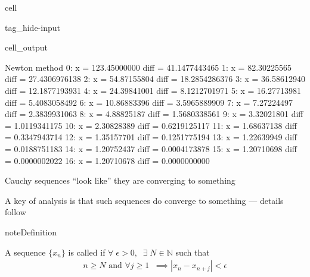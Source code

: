 \documentclass[letterpaper,10pt,english]{jupyterBook}
\begin{document}
\begin{sphinxuseclass}{cell}
\begin{sphinxuseclass}{tag_hide-input}\begin{sphinxVerbatimOutput}

\begin{sphinxuseclass}{cell_output}
\begin{sphinxVerbatim}[commandchars=\\\{\}]
Newton method
   0:  x =   123.45000000    diff =  41.1477443465
   1:  x =    82.30225565    diff =  27.4306976138
   2:  x =    54.87155804    diff =  18.2854286376
   3:  x =    36.58612940    diff =  12.1877193931
   4:  x =    24.39841001    diff =   8.1212701971
   5:  x =    16.27713981    diff =   5.4083058492
   6:  x =    10.86883396    diff =   3.5965889909
   7:  x =     7.27224497    diff =   2.3839931063
   8:  x =     4.88825187    diff =   1.5680338561
   9:  x =     3.32021801    diff =   1.0119341175
  10:  x =     2.30828389    diff =   0.6219125117
  11:  x =     1.68637138    diff =   0.3347943714
  12:  x =     1.35157701    diff =   0.1251775194
  13:  x =     1.22639949    diff =   0.0188751183
  14:  x =     1.20752437    diff =   0.0004173878
  15:  x =     1.20710698    diff =   0.0000002022
  16:  x =     1.20710678    diff =   0.0000000000
\end{sphinxVerbatim}

\end{sphinxuseclass}\end{sphinxVerbatimOutput}

\end{sphinxuseclass}
\end{sphinxuseclass}
\sphinxAtStartPar
Cauchy sequences “look like” they are converging to something

\sphinxAtStartPar
A key  of analysis is that such sequences do converge to
something — details follow

\begin{sphinxadmonition}{note}{Definition}

\sphinxAtStartPar
A sequence \(\{x_n\}\) is called  if
\(\forall \; \epsilon > 0, \;\; \exists \; N \in \mathbb{N}\) such that
\begin{equation*}
\begin{split}
n \geq N 
\text{ and } \forall j \geq 1 \;\; 
\implies |x_n - x_{n+j}| < \epsilon
\end{split}
\end{equation*}\end{sphinxadmonition}
\end{document}
